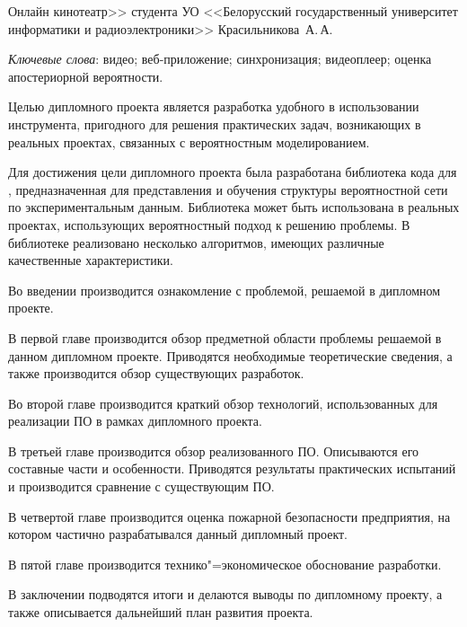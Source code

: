 \thispagestyle{empty}

\begin{center}
  \begin{minipage}{0.82\textwidth}
    Онлайн кинотеатр>> студента УО <<Белорусский государственный университет информатики и радиоэлектроники>> Красильникова~А.\,А.
  \end{minipage}
\end{center}

\emph{Ключевые слова}: видео; веб-приложение; синхронизация; видеоплеер; оценка апостериорной вероятности.

\vspace{4\parsep}


Целью дипломного проекта является разработка удобного в использовании инструмента, пригодного для решения практических задач, возникающих в реальных проектах, связанных с вероятностным моделированием.

Для достижения цели дипломного проекта была разработана библиотека кода для \dotnet{}, предназначенная для представления и обучения структуры вероятностной сети по экспериментальным данным.
Библиотека может быть использована в реальных проектах, использующих вероятностный подход к решению проблемы.
В библиотеке реализовано несколько алгоритмов, имеющих различные качественные характеристики.

Во введении производится ознакомление с проблемой, решаемой в дипломном проекте.

В первой главе производится обзор предметной области проблемы решаемой в данном дипломном проекте.
Приводятся необходимые теоретические сведения, а также производится обзор существующих разработок.

Во второй главе производится краткий обзор технологий, использованных для реализации ПО в рамках дипломного проекта.

В третьей главе производится обзор реализованного ПО.
Описываются его составные части и особенности.
Приводятся результаты практических испытаний и производится сравнение с существующим ПО.

В четвертой главе производится оценка пожарной безопасности предприятия, на котором частично разрабатывался данный дипломный проект.

В пятой главе производится технико"=экономическое обоснование разработки.

В заключении подводятся итоги и делаются выводы по дипломному проекту, а также описывается дальнейший план развития проекта.

\clearpage
